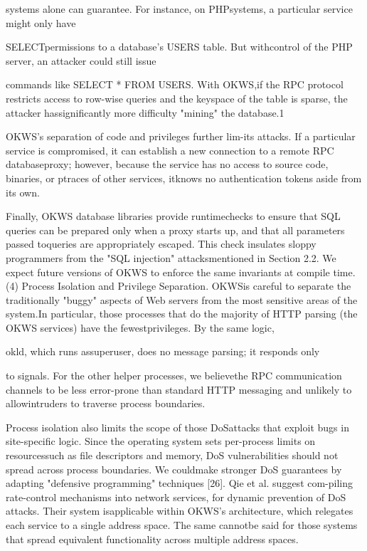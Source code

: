 systems alone can guarantee. For instance, on PHPsystems, a particular service might only have

SELECTpermissions to a database's
USERS table. But withcontrol of the PHP server, an attacker could still issue

commands like SELECT * FROM USERS. With OKWS,if the RPC protocol restricts access to row-wise queries
and the keyspace of the table is sparse, the attacker hassignificantly more difficulty "mining" the database.1

OKWS's separation of code and privileges further lim-its attacks. If a particular service is compromised, it can
establish a new connection to a remote RPC databaseproxy; however, because the service has no access to
source code, binaries, or ptraces of other services, itknows no authentication tokens aside from its own.

Finally, OKWS database libraries provide runtimechecks to ensure that SQL queries can be prepared only
when a proxy starts up, and that all parameters passed toqueries are appropriately escaped. This check insulates
sloppy programmers from the "SQL injection" attacksmentioned in Section 2.2. We expect future versions of
OKWS to enforce the same invariants at compile time.
(4) Process Isolation and Privilege Separation. OKWSis careful to separate the traditionally "buggy" aspects of
Web servers from the most sensitive areas of the system.In particular, those processes that do the majority of
HTTP parsing (the OKWS services) have the fewestprivileges. By the same logic,

okld, which runs assuperuser, does no message parsing; it responds only

to signals. For the other helper processes, we believethe RPC communication channels to be less error-prone
than standard HTTP messaging and unlikely to allowintruders to traverse process boundaries.

Process isolation also limits the scope of those DoSattacks that exploit bugs in site-specific logic. Since
the operating system sets per-process limits on resourcessuch as file descriptors and memory, DoS vulnerabilities
should not spread across process boundaries. We couldmake stronger DoS guarantees by adapting "defensive
programming" techniques [26]. Qie et al. suggest com-piling rate-control mechanisms into network services, for
dynamic prevention of DoS attacks. Their system isapplicable within OKWS's architecture, which relegates
each service to a single address space. The same cannotbe said for those systems that spread equivalent functionality across multiple address spaces.


